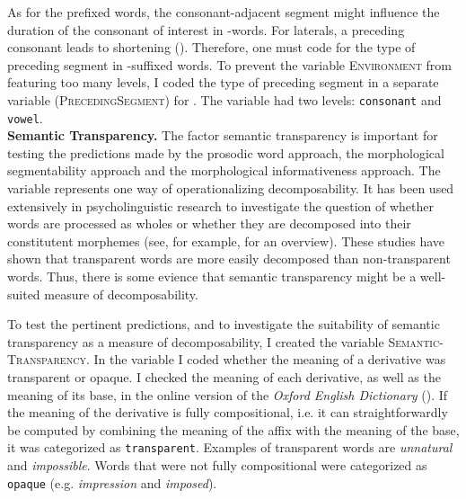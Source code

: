 As for the prefixed words, the consonant-adjacent segment might influence the duration of the consonant of interest in -words. For laterals, a preceding consonant leads to shortening (\citealt[851]{Umeda.1977}). Therefore, one must code for the type of preceding segment in -suffixed words. 
To prevent the variable \textsc{Environment} from featuring too many levels, I coded the type of preceding segment in a separate variable (\textsc{PrecedingSegment}) for . The variable had two levels: \texttt{consonant} and \texttt{vowel}. \\


\textbf{Semantic Transparency.} The factor semantic transparency is important for testing the predictions made by the prosodic word approach, the morphological segmentability approach and the morphological informativeness approach. 
The variable represents one way of operationalizing decomposability. It has been used extensively in psycholinguistic research to investigate the question of whether words are processed as wholes or whether they are decomposed into their constitutent morphemes (see, for example, \citet{MarslenWilson.2009} for an overview). These studies have shown that transparent words are more easily decomposed than non-transparent words. Thus, there is some evience that semantic transparency might be a well-suited measure of decomposability. 

To test the pertinent predictions, and to investigate the suitability of semantic transparency as a measure of decomposability, I created the variable \textsc{Semantic-Transparency}. In the variable I coded whether the meaning of a derivative was transparent or opaque.
I checked the meaning of each derivative, as well as the meaning of its base, in the online version of the \textit{Oxford English Dictionary} (\citealt{OED.2013}).  If the meaning of the derivative is fully compositional, i.e. it can straightforwardly be computed by combining the meaning of the affix with the meaning of the base, it was categorized as \texttt{transparent}. 
Examples of transparent words are \textit{unnatural} and \textit{impossible}. Words that were not fully compositional were categorized as \texttt{opaque} (e.g. \textit{impression} and \textit{imposed}). 

